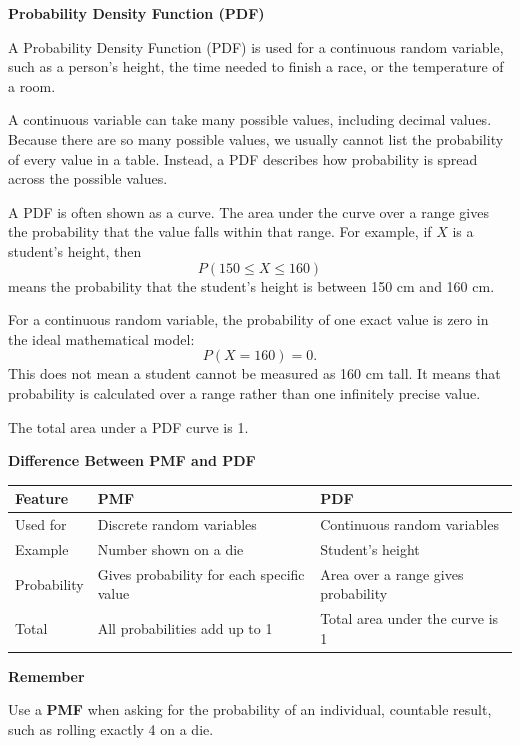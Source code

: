 \textbf{Probability Density Function (PDF)}

A Probability Density Function (PDF) is used for a continuous random variable, such as a person's height, the time needed to finish a race, or the temperature of a room.

A continuous variable can take many possible values, including decimal values. Because there are so many possible values, we usually cannot list the probability of every value in a table. Instead, a PDF describes how probability is spread across the possible values.

A PDF is often shown as a curve. The area under the curve over a range gives the probability that the value falls within that range. For example, if \(X\) is a student's height, then
\[
P(150 \leq X \leq 160)
\]
means the probability that the student's height is between 150 cm and 160 cm.

For a continuous random variable, the probability of one exact value is zero in the ideal mathematical model:
\[
P(X=160)=0.
\]
This does not mean a student cannot be measured as 160 cm tall. It means that probability is calculated over a range rather than one infinitely precise value.

The total area under a PDF curve is 1.

\textbf{Difference Between PMF and PDF}

\begin{center}
\begin{tabular}{>{\raggedright\arraybackslash}p{} >{\raggedright\arraybackslash}p{} >{\raggedright\arraybackslash}p{}}
\toprule
\textbf{Feature} & \textbf{PMF} & \textbf{PDF} \\
\midrule
Used for & Discrete random variables & Continuous random variables \\
Example & Number shown on a die & Student's height \\
Probability & Gives probability for each specific value & Area over a range gives probability \\
Total & All probabilities add up to 1 & Total area under the curve is 1 \\
\bottomrule
\end{tabular}
\end{center}

\textbf{Remember}

Use a \textbf{PMF} when asking for the probability of an individual, countable result, such as rolling exactly 4 on a die.


